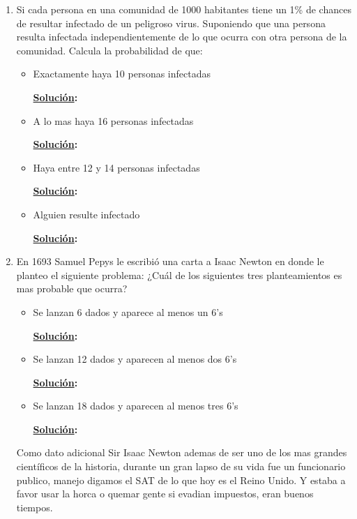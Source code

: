 \documentclass[11pt,letterpaper]{report}
\newcommand{\sol}{\textbf{\underline{Solución}: }} %
\begin{document}
\begin{enumerate}

\item Si cada persona en una comunidad de 1000 habitantes tiene un 1\% de chances de resultar
infectado de un peligroso virus. Suponiendo que una persona resulta infectada independientemente de
lo que ocurra con otra persona de la comunidad. Calcula la probabilidad de que:
\begin{itemize}
    \item Exactamente haya 10 personas infectadas
    
    \sol
    
    \item A lo mas haya 16 personas infectadas
    
    \sol

    \item Haya entre 12 y 14 personas infectadas
    
    \sol

    \item Alguien resulte infectado
    
    \sol

\end{itemize}

\item En 1693 Samuel Pepys le escribió una carta a Isaac Newton en donde le planteo el siguiente
problema: ¿Cuál de los siguientes tres planteamientos es mas probable que ocurra?
\begin{itemize}
    
    \item Se lanzan 6 dados y aparece al menos un 6's
    
    \sol

    \item Se lanzan 12 dados y aparecen al menos dos 6’s
    
    \sol
    
    \item Se lanzan 18 dados y aparecen al menos tres 6’s
    
    \sol
\end{itemize}
    
Como dato adicional Sir Isaac Newton ademas de ser uno de los mas grandes científicos de la historia,
durante un gran lapso de su vida fue un funcionario publico, manejo digamos el SAT de lo que hoy es
el Reino Unido. Y estaba a favor usar la horca o quemar gente si evadian impuestos, eran buenos tiempos.


\end{enumerate}
\end{document}
